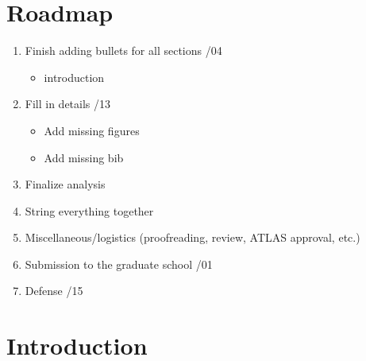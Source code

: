 \documentclass{msuphddissertation}
\begin{document}
\newpage
{}
\begin{doublespace}


{
\FormatChapterTitles  %



\chapter*{Roadmap}
\begin{enumerate}
\item Finish adding bullets for all sections /04
	\begin{itemize} Remaining
	\item introduction
	\end{itemize}
\item Fill in details /13
	\begin{itemize}
	\item Add missing figures
	\item Add missing bib
	\end{itemize}
\item Finalize analysis
\item String everything together
\item Miscellaneous/logistics (proofreading, review, ATLAS approval, etc.) \dotfill
\item Submission to the graduate school /01
\item Defense /15
\end{enumerate}

\chapter{Introduction}
\label{chap:intro}


}
\end{doublespace}
\end{document}
